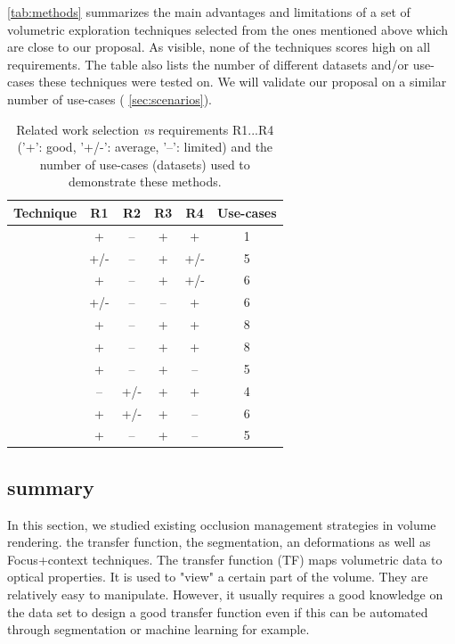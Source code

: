 \autoref{tab:methods} summarizes the main advantages and limitations of a set of volumetric exploration techniques selected from the ones mentioned above which are close to our proposal. As visible, none of the techniques scores high on all requirements. The table also lists the number of different datasets and/or use-cases these techniques were tested on. We will validate our proposal on a similar number of use-cases ( \autoref{sec:scenarios}).
\begin{table}
\centering
\large
\begin{tabular}{ |c|c|c|c|c|c| }
\hline
\textbf{Technique} & \textbf{R1} & \textbf{R2} & \textbf{R3} & \textbf{R4} & \textbf{Use-cases}\\
\hline
\hline
\cite{1250400} & + & -- & + & + & 1\\
\cite{Sonnet:2004:IEA:989863.989871} & +/- & -- & + & +/- & 5\\
\cite{1532818} & + & -- & + & +/- & 6\\
\cite{4015467} & +/- & -- & -- & + & 6\\
\cite{Correa:2006:FAV:1187627.1187827} & + & -- & + & + & 8\\
\cite{Correa:2007:IDD:1313046.1313163} & + & -- & + & + & 8\\
\cite{5613463} & + & -- & + & -- & 5\\
\cite{Hsu:2011:RFM:2070781.2024165} & -- & +/- & + & + & 4\\
\cite{6787171} & + & +/- & + & -- & 6\\
\cite{7120994} & + & -- & + & -- & 5\\
\hline
\end{tabular}
\caption{Related work selection \emph{vs} requirements R1...R4 ('+': good, '+/-': average, '--': limited) and the number of use-cases (datasets) used to demonstrate these methods.}
\label{tab:methods}
\end{table}

\subsection{summary}
In this section, we studied existing occlusion  management strategies in volume rendering. 
the transfer function, the segmentation, an deformations as well as Focus+context techniques. 
The transfer function (TF) maps volumetric data to optical properties. It is used to "view" a certain part of the volume. They are relatively easy to manipulate. However, it usually requires a good knowledge on the data set to design a good transfer function even if this can be automated through segmentation or machine learning for example.


